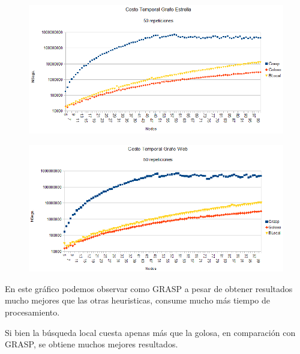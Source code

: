 \begin{figure}[H]
	\centering
	\includegraphics[scale=0.6]{timingStar.png}
\end{figure}

\begin{figure}[H]
	\centering
	\includegraphics[scale=0.6]{timingWeb.png}
\end{figure}

\quad

\quad En este gráfico podemos observar como GRASP a pesar de obtener resultados mucho mejores que las otras heuristicas, consume mucho más tiempo de procesamiento.

\quad

\quad Si bien la búsqueda local cuesta apenas más que la golosa, en comparación con GRASP, se obtiene muchos mejores resultados.
